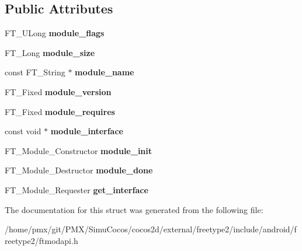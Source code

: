\subsection*{Public Attributes}
\begin{DoxyCompactItemize}
\item 
\mbox{\label{structFT__Module__Class___a54a02a3767955cd8fa0cd786bd1f9515}} 
F\+T\+\_\+\+U\+Long {\bfseries module\+\_\+flags}
\item 
\mbox{\label{structFT__Module__Class___a2582eeab364e4fbbd5d1e420bfcf3207}} 
F\+T\+\_\+\+Long {\bfseries module\+\_\+size}
\item 
\mbox{\label{structFT__Module__Class___a71f8061958982d07ff26e8fc40edd94d}} 
const F\+T\+\_\+\+String $\ast$ {\bfseries module\+\_\+name}
\item 
\mbox{\label{structFT__Module__Class___a5b649f1965c42fd8c54bbc370fbf60b4}} 
F\+T\+\_\+\+Fixed {\bfseries module\+\_\+version}
\item 
\mbox{\label{structFT__Module__Class___a24772981bd972d342f54a6e1704f85c3}} 
F\+T\+\_\+\+Fixed {\bfseries module\+\_\+requires}
\item 
\mbox{\label{structFT__Module__Class___a138406669eb20543603c74a1fb1afeb3}} 
const void $\ast$ {\bfseries module\+\_\+interface}
\item 
\mbox{\label{structFT__Module__Class___a60f2bb9eee68366f20fe0613f347ffbd}} 
F\+T\+\_\+\+Module\+\_\+\+Constructor {\bfseries module\+\_\+init}
\item 
\mbox{\label{structFT__Module__Class___ab6e9c780519e24a51144df79692cf339}} 
F\+T\+\_\+\+Module\+\_\+\+Destructor {\bfseries module\+\_\+done}
\item 
\mbox{\label{structFT__Module__Class___aa72d79fcd0991231e24e88f359244e8e}} 
F\+T\+\_\+\+Module\+\_\+\+Requester {\bfseries get\+\_\+interface}
\end{DoxyCompactItemize}


The documentation for this struct was generated from the following file\+:\begin{DoxyCompactItemize}
\item 
/home/pmx/git/\+P\+M\+X/\+Simu\+Cocos/cocos2d/external/freetype2/include/android/freetype2/ftmodapi.\+h\end{DoxyCompactItemize}
